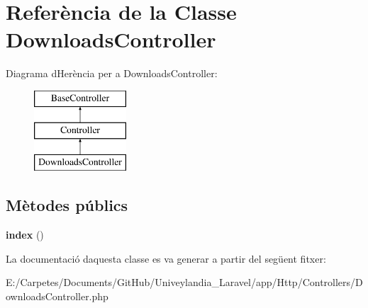 \hypertarget{class_app_1_1_http_1_1_controllers_1_1_downloads_controller}{}\section{Referència de la Classe Downloads\+Controller}
\label{class_app_1_1_http_1_1_controllers_1_1_downloads_controller}
Diagrama d\textquotesingle{}Herència per a Downloads\+Controller\+:\begin{figure}[H]
\begin{center}
\leavevmode
\includegraphics[height=3.000000cm]{class_app_1_1_http_1_1_controllers_1_1_downloads_controller}
\end{center}
\end{figure}
\subsection*{Mètodes públics}
\begin{DoxyCompactItemize}
\item 
\mbox{\label{class_app_1_1_http_1_1_controllers_1_1_downloads_controller_a149eb92716c1084a935e04a8d95f7347}} 
{\bfseries index} ()
\end{DoxyCompactItemize}


La documentació d\textquotesingle{}aquesta classe es va generar a partir del següent fitxer\+:\begin{DoxyCompactItemize}
\item 
E\+:/\+Carpetes/\+Documents/\+Git\+Hub/\+Univeylandia\+\_\+\+Laravel/app/\+Http/\+Controllers/Downloads\+Controller.\+php\end{DoxyCompactItemize}
